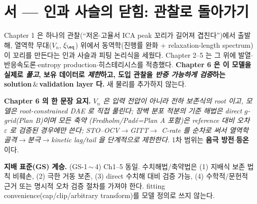 
\section*{서 — 인과 사슬의 닫힘: 관찰로 돌아가기}
Chapter 1 은 하나의 관찰(``저온$\cdot$고율서 ICA peak 꼬리가 길어져 겹친다'')에서 출발해, 열역학 무대($V_n$,
$\xi_{\eq}$) 위에서 동역학(진행률 완화 + relaxation-length spectrum)이 꼬리를 만든다는 인과 사슬과 피팅
논리식을 세웠다. Chapter 2--5 는 그 위에 발열$\cdot$반응속도론$\cdot$entropy production$\cdot$히스테리시스를
적층했다. \textbf{Chapter 6 은 이 모델을 실제로 \emph{풀고}, 보유 데이터로 \emph{제한}하고, 도입 관찰을
\emph{반증 가능하게 검증}하는 solution\,$\&$\,validation layer 다.} 새 물리를 추가하지 않는다.

\textbf{Chapter 6 의 한 문장 요지.} \emph{$V_n$ 은 입력 전압이 아니라 전하 보존식의 root 이고, 모델은
root-constrained DAE 로 직접 풀린다; 장벽 분포 적분의 기준 해법은 direct $g$-grid(Plan B)이며 모든 축약
(Fredholm/Padé=Plan A 포함)은 reference 대비 오차 $\varepsilon$ 로 검증된 경우에만 쓴다; STO--OCV$\to$GITT$\to$
C-rate 를 순차로 써서 열역학 골격$\to$분극$\to$kinetic lag/tail 을 단계적으로 제한한다.} 1차 범위는
\textbf{음극 방전$\cdot$등온}이다.

\begin{groundingbox}
\textbf{지배 표준(GS) 계승.} (GS-1\,$\sim$\,4) Ch1--5 동일. 수치해법/축약법은 (1) 지배식 보존 법칙 비훼손,
(2) 극한 거동 보존, (3) direct 수치해 대비 검증 가능, (4) 수학적/문헌적 근거 또는 명시적 오차 검증 절차를
가져야 한다. fitting convenience(cap/clip/arbitrary transform)를 모델 정의로 쓰지 않는다.
\end{groundingbox}


